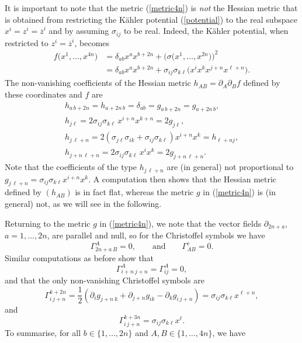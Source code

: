 \documentclass[pdftex]{sigma}
\numberwithin{equation}{section}
\newcommand{\1}{\mathbf{1}}
\newcommand{\+}{\oplus}
\newcommand{\del}{\partial}
\renewcommand{\=}{\equiv}
\begin{document}
\begin{Remark}
It is important to note that the metric (\ref{metric4n}) is {\em not} the Hessian metric that is obtained from restricting the K\"{a}hler potential (\ref{potential}) to the real subspace $x^i=z^i=\overline{z}^i$ and by assuming $\sigma_{ij}$ to be real.
Indeed, the K\"{a}hler potential, when restricted to $z^i=\overline{z}^i$, becomes
\begin{align*}
f\bigl(x^1,\ldots , x^{4n}\bigr)
&{}=
\delta_{ab} x^a{x}^{b+2n}+
\bigl(\sigma\bigl(x^1,\ldots, x^{2n}\bigr)\bigr)^2
\nonumber\\
&{}=
\delta_{ab} x^a{x}^{b+2n}
+
\sigma_{ij}{\sigma}_{k\ell}
 \bigl(
 x^{i}x^k x^{j+n}{x}^{\ell+n}
 \bigr).%
\end{align*}
The non-vanishing coefficients of the Hessian metric $h_{AB}=\partial_A\partial_B f$ defined by these coordinates and $f$ are
\begin{gather*}%
h_{a\, b+2n} = h_{a+2n\, b} = \delta_{ab} { = g_{a\, b+2n} = g_{a+2n\, b}},
\\
h_{j\ell} =
2\sigma_{ij}{\sigma}_{k\ell}\,
 x^{i+n}{x}^{k+n} { = 2g_{j\ell}},
\\
h_{j\, \ell+n} =
2\left(\sigma_{j\ell}\sigma_{ik}+ \sigma_{ij}{\sigma}_{k\ell}\right)
 x^{i+n}{x}^{k} = h_{\ell+n j},
\\
h_{j+n\, \ell+n} = 2
\sigma_{ij}{\sigma}_{k\ell}\,
 x^{i}{x}^{k} { = 2g_{j+n\, \ell+n}.}
\end{gather*}
Note that the coefficients of the type $h_{j\, \ell+n}$ are (in general) not proportional to
$g_{j\, \ell+n}= \sigma_{ij}{\sigma}_{k\ell}
 x^{i+n}{x}^{k}$.
A computation then shows that the Hessian metric defined by {$(h_{AB})$} is in fact flat, whereas the metric $g$ in (\ref{metric4n}) is {(in general)} not, as we will see in the following.
\end{Remark}
Returning to the metric $g$ in (\ref{metric4n}), we note that the vector fields $\del_{2n+a}$, $a=1,\ldots , 2n$, are parallel and null, so for the Christoffel symbols we have
\[ \Gamma^A_{2n+a\,B}=0,\qquad \text{and}\qquad \Gamma^{c}_{AB} =0.\]
{Similar} computations as before show that
\[\Gamma^{A}_{i+n\ j+n}=\Gamma^{A}_{i j}=0,\]
and that the only non-vanishing Christoffel symbols are
 \[
 \Gamma^{k+2n}_{i\, j+n}
 =\frac{1}{2}( \partial_ig_{j+n\ k}+\partial_{j+n}g_{ik}-\partial_kg_{i\, j+n})
 =
 \sigma_{ij}\sigma_{k\ell}x^{\ell+n},
\]
and
\[
 \Gamma^{k+3n}_{i\, j+n}
 =
 \sigma_{ij}\sigma_{k\ell}x^{\ell}.
\]
To summarise, for all $b\in \{1, \ldots, 2n\}$ and $A,B\in \{1, \ldots, 4n\}$, we have
\end{document}
